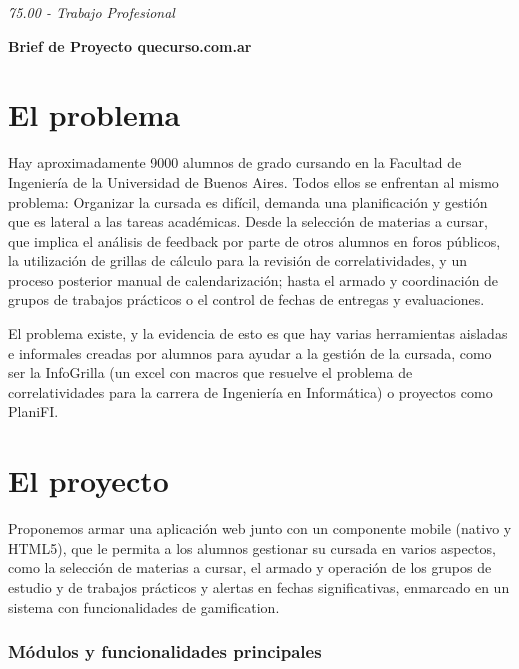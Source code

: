 \documentclass[a4paper,11pt]{article}
\begin{document}
\begin{center}
\baselineskip=18pt
{\LARGE{}{\color{color01} \textit{75.00 - Trabajo Profesional}}}

\vspace{18pt}
{\huge{}\textbf{Brief de Proyecto quecurso.com.ar}}
\end{center}

\vspace{10pt}
\section*{{\Large{}El problema}}

\baselineskip=18pt
\leftskip=0pt
Hay aproximadamente 9000 alumnos de grado cursando en la Facultad de Ingeniería 
de la Universidad de Buenos Aires. Todos ellos se enfrentan al mismo problema: 
Organizar la cursada es difícil, demanda una planificación y gestión que es 
lateral a las tareas académicas. Desde la selección de materias a cursar, que 
implica el análisis de feedback por parte de otros alumnos en foros públicos, 
la utilización de grillas de cálculo para la revisión de correlatividades, y 
un proceso posterior manual de calendarización; hasta el armado y coordinación 
de grupos de trabajos prácticos o el control de fechas de entregas y evaluaciones.

El problema existe, y la evidencia de esto es que hay varias herramientas aisladas 
e informales creadas por alumnos para ayudar a la gestión de la cursada, como 
ser la InfoGrilla (un excel con macros que resuelve el problema de correlatividades 
para la carrera de Ingeniería en Informática) o proyectos como PlaniFI.

\vspace{10pt}
\section*{{\Large{}El proyecto}}

Proponemos armar una aplicación web junto con un componente mobile (nativo y HTML5), 
que le permita a los alumnos gestionar su cursada en varios aspectos, como la selección 
de materias a cursar, el armado y operación de los grupos de estudio y de trabajos 
prácticos y alertas en fechas significativas, enmarcado en un sistema con funcionalidades 
de gamification.

\vspace{8pt}
\subsubsection*{{\color{color01} \textbf{Módulos y funcionalidades principales}}}
\end{document}
